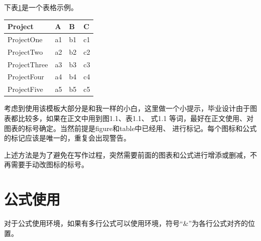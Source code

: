 {\begin{spacing}{1.5}
下表\ref{sampeltable}是一个表格示例。

{\wuhao\songti
\begin{table}[htb]
\begin{center}
\label{sampeltable}
\begin{tabular}{m{3cm} m{2cm} m{2cm} m{2cm}}
  \hline
  Project & A & B & C\\
  \hline
  ProjectOne& a1 & b1 & c1 \\
  ProjectTwo & a2 & b2 & c2 \\
  ProjectThree & a3 & b3 & c3 \\
  ProjectFour& a4 & b4 & c4 \\
  ProjectFive & a5& b5 & c5 \\
  \hline
\end{tabular}
\end{center}
\end{table}}

考虑到使用该模板大部分是和我一样的小白，这里做一个小提示，毕业设计由于图表都比较多，如果在正文中用到图1.1、表1.1、 式1.1 等词，最好在正文使用、对图表的标号确定。当然前提是figure和table中已经用、 进行标记。每个图标和公式的标记应该是唯一的，重复会出现警告。

上述方法是为了避免在写作过程，突然需要前面的图表和公式进行增添或删减，不再需要手动改图标的标号。

\section{公式使用}
对于公式使用环境，如果有多行公式可以使用环境，符号“\&”为各行公式对齐的位置。


\end{spacing}}
